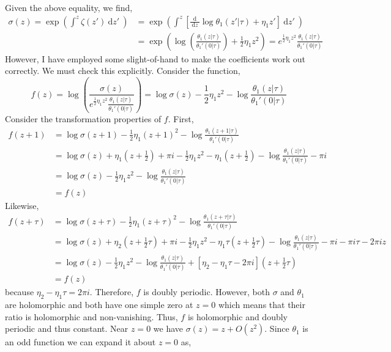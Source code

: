 \documentclass[12pt]{extarticle}
\renewcommand{\d}[1]{\: \mathrm{d}#1 \:}
\newcommand{\deriv}[2]{\frac{\d{#1}}{\d{#2}}}
\theoremstyle{definition}
\begin{document}
Given the above equality,
we find,
\begin{align*}
\sigma(z) = \exp{\left( \int^z \zeta(z') \d{z'} \right)} & = \exp{\left( \int^z \left[ \deriv{}{z} \log{\theta_1(z' | \tau)} + \eta_1 z' \right] \d{z'}  \right)} 
\\
& = \exp{\left( \log{\left( \frac{\theta_1(z | \tau)}{\theta_1'(0 |\tau)} \right)} + \frac{1}{2} \eta_1 z^2 \right)} = e^{\frac{1}{2} \eta_1 z^2} \frac{\theta_1(z | \tau)}{\theta_1'(0 |\tau)}
\end{align*}
However, I have employed some slight-of-hand to make the coefficients work out correctly. We must check this explicitly. Consider the function,
\[ f(z) = \log{\left( \frac{\sigma(z)}{e^{\frac{1}{2} \eta_1 z^2} \frac{\theta_1(z | \tau)}{\theta_1'(0 |\tau)}} \right)} = \log{\sigma(z)} - \frac{1}{2} \eta_1 z^2 - \log{\frac{\theta_1(z | \tau)}{\theta_1'(0 | \tau)}} \]
Consider the transformation properties of $f$. First,
\begin{align*}
f(z + 1) & = \log{\sigma(z + 1)} - \frac{1}{2} \eta_1 (z + 1)^2 - \log{\frac{\theta_1(z + 1 | \tau)}{\theta_1'(0 | \tau)}}
\\
& = \log{\sigma(z)} + \eta_1 (z + \tfrac{1}{2}) + \pi i - \frac{1}{2} \eta_1 z^2 - \eta_1 (z + \tfrac{1}{2}) - \log{\frac{\theta_1(z | \tau)}{\theta_1'(0 | \tau)}} - \pi i 
\\
& = \log{\sigma(z)} - \frac{1}{2} \eta_1 z^2 - \log{\frac{\theta_1(z | \tau)}{\theta_1'(0 | \tau)}}
\\
& = f(z)
\end{align*}
Likewise,
\begin{align*}
f(z + \tau) & = \log{\sigma(z + \tau)} - \frac{1}{2} \eta_1 (z + \tau)^2 - \log{\frac{\theta_1(z + \tau | \tau)}{\theta_1'(0 | \tau)}}
\\
& = \log{\sigma(z)} + \eta_2 (z + \tfrac{1}{2} \tau) + \pi i - \frac{1}{2} \eta_1 z^2 - \eta_1 \tau (z + \tfrac{1}{2} \tau) - \log{\frac{\theta_1(z | \tau)}{\theta_1'(0 | \tau)}} - \pi i - \pi i \tau - 2 \pi i z
\\
& = \log{\sigma(z)} - \frac{1}{2} \eta_1 z^2 - \log{\frac{\theta_1(z | \tau)}{\theta_1'(0 | \tau)}} + [\eta_2 - \eta_1 \tau - 2 \pi i] (z + \tfrac{1}{2} \tau)
\\
& = f(z)
\end{align*}
because $\eta_2 - \eta_1 \tau = 2 \pi i $.
Therefore, $f$ is doubly periodic. However, both $\sigma$ and $\theta_1$ are holomorphic and both have one simple zero at $z = 0$ which means that their ratio is holomorphic and non-vanishing. Thus, $f$ is holomorphic and doubly periodic and thus constant. Near $z = 0$ we have $\sigma(z) = z + O(z^2)$. Since $\theta_1$ is an odd function we can expand it about $z = 0$ as,
\end{document}
